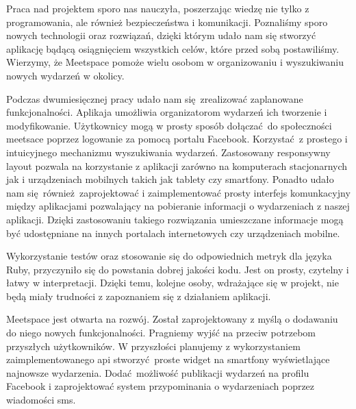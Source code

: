 Praca nad projektem sporo nas nauczyła, poszerzając wiedzę nie tylko z programowania, ale również bezpieczeństwa i komunikacji. Poznaliśmy sporo nowych technologii oraz rozwiązań, dzięki którym udało nam się stworzyć aplikację bądącą osiągnięciem wszystkich celów, które przed sobą postawiliśmy.
Wierzymy, że Meetspace pomoże wielu osobom w organizowaniu i wyszukiwaniu nowych wydarzeń w okolicy.

Podczas dwumiesięcznej pracy udało nam się zrealizować zaplanowane funkcjonalności.
Aplikaja umożliwia organizatorom wydarzeń ich tworzenie i modyfikowanie. Użytkownicy mogą w prosty sposób dołączać do społeczności meetsace poprzez logowanie za pomocą portalu Facebook. Korzystać z prostego i intuicyjnego mechanizmu wyszukiwania wydarzeń. Zastosowany responsywny layout pozwala na korzystanie z aplikacji zarówno na komputerach stacjonarnych jak i urządzeniach mobilnych takich jak tablety czy smartfony.
Ponadto udało nam się również zaprojektować i zaimplementować prosty interfejs komunkacyjny między aplikacjami pozwalający na pobieranie informacji o wydarzeniach z naszej aplikacji. Dzięki zastosowaniu takiego rozwiązania umieszczane informacje mogą być udostępniane na innych portalach internetowych czy urządzeniach mobilne.

Wykorzystanie testów oraz stosowanie się do odpowiednich metryk dla języka Ruby, przyczyniło się do powstania dobrej jakości kodu. Jest on prosty, czytelny i łatwy w interpretacji. Dzięki temu, kolejne osoby, wdrażające się w projekt, nie będą miały trudności z zapoznaniem się z działaniem aplikacji.

Meetspace jest otwarta na rozwój. Został zaprojektowany z myślą o dodawaniu do niego nowych funkcjonalności. Pragniemy wyjść na przeciw potrzebom przyszłych użytkowników. W przyszłości planujemy z wykorzystaniem zaimplementowanego api stworzyć proste widget na smartfony wyświetlające najnowsze wydarzenia. Dodać możliwość publikacji wydarzeń na profilu Facebook i zaprojektować system przypominania o wydarzeniach poprzez wiadomości sms.

